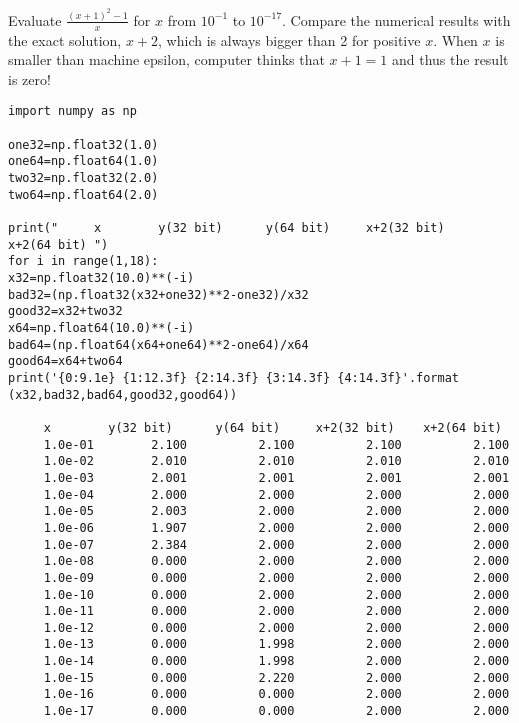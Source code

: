 \begin{example}
	\label{ex:twosimilarvalues}
	Evaluate $\displaystyle\frac{(x+1)^2-1}{x}$ for $x$ from $10^{-1}$ to $10^{-17}$.
	Compare the numerical results with the exact solution, $x+2$, which is always bigger than 2 for positive $x$.  When $x$ is smaller than machine epsilon, computer thinks that $x+1=1$ and thus the result is zero!
	\begin{center}
		\begin{minipage}{0.9\textwidth}
			\small
			\begin{Verbatim}[frame=single]
import numpy as np

one32=np.float32(1.0)
one64=np.float64(1.0)
two32=np.float32(2.0)
two64=np.float64(2.0)

print("     x        y(32 bit)      y(64 bit)     x+2(32 bit)    x+2(64 bit) ")
for i in range(1,18):
x32=np.float32(10.0)**(-i)
bad32=(np.float32(x32+one32)**2-one32)/x32
good32=x32+two32
x64=np.float64(10.0)**(-i)
bad64=(np.float64(x64+one64)**2-one64)/x64
good64=x64+two64
print('{0:9.1e} {1:12.3f} {2:14.3f} {3:14.3f} {4:14.3f}'.format
(x32,bad32,bad64,good32,good64)) 

     x        y(32 bit)      y(64 bit)     x+2(32 bit)    x+2(64 bit) 
     1.0e-01        2.100          2.100          2.100          2.100
     1.0e-02        2.010          2.010          2.010          2.010
     1.0e-03        2.001          2.001          2.001          2.001
     1.0e-04        2.000          2.000          2.000          2.000
     1.0e-05        2.003          2.000          2.000          2.000
     1.0e-06        1.907          2.000          2.000          2.000
     1.0e-07        2.384          2.000          2.000          2.000
     1.0e-08        0.000          2.000          2.000          2.000
     1.0e-09        0.000          2.000          2.000          2.000
     1.0e-10        0.000          2.000          2.000          2.000
     1.0e-11        0.000          2.000          2.000          2.000
     1.0e-12        0.000          2.000          2.000          2.000
     1.0e-13        0.000          1.998          2.000          2.000
     1.0e-14        0.000          1.998          2.000          2.000
     1.0e-15        0.000          2.220          2.000          2.000
     1.0e-16        0.000          0.000          2.000          2.000
     1.0e-17        0.000          0.000          2.000          2.000

			\end{Verbatim}
			\normalsize
		\end{minipage}
	\end{center}
\end{example} 
 
